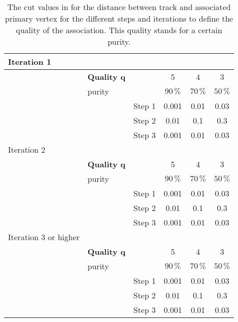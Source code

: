 
\begin{table}[h]
\begin{center}
\caption{The cut values in \cm for the distance between track and associated primary vertex for the different steps and iterations to define the quality of the association. This quality stands for a certain purity.}
\label{tab:AMWFQD}
\begin{tabular}{l l c | c | c | c}

Iteration 1 & & & & & \\
\hline
 & \textbf{Quality q} & & 5 & 4 & 3  \\
 & purity & & $90\,\%$ & $70\,\%$ & $50\,\%$   \\
\hline 
 &  & Step 1 & 0.001 & 0.01 & 0.03 \\
\hline
 &  & Step 2 & 0.01 & 0.1 & 0.3 \\
\hline
 &  & Step 3 & 0.001 & 0.01 & 0.03 \\
\hline \hline

Iteration 2 & & & & & \\
\hline
 & \textbf{Quality q} & & 5 & 4 & 3  \\
 & purity & & $90\,\%$ & $70\,\%$ & $50\,\%$   \\
\hline 
 &  & Step 1 & 0.001 & 0.01 & 0.03 \\
\hline
 &  & Step 2 & 0.01 & 0.1 & 0.3 \\
\hline
 &  & Step 3 & 0.001 & 0.01 & 0.03 \\
\hline \hline

Iteration 3 or higher & & & & & \\
\hline
 & \textbf{Quality q} & & 5 & 4 & 3  \\
 & purity & & $90\,\%$ & $70\,\%$ & $50\,\%$   \\
\hline 
 &  & Step 1 & 0.001 & 0.01 & 0.03 \\
\hline
 &  & Step 2 & 0.01 & 0.1 & 0.3 \\
\hline
 &  & Step 3 & 0.001 & 0.01 & 0.03 \\
\hline \hline
\end{tabular}
\end{center}
\end{table}